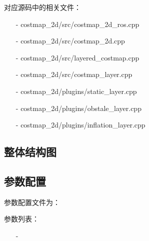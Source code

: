 \documentclass[9pt, oneside]{book}
\begin{document}
对应源码中的相关文件：

\begin{itemize}
    \item [-] costmap\_2d/src/costmap\_2d\_ros.cpp
    \item [-] costmap\_2d/src/costmap\_2d.cpp
    \item [-] costmap\_2d/src/layered\_costmap.cpp
    \item [-] costmap\_2d/src/costmap\_layer.cpp
    \item [-] costmap\_2d/plugins/static\_layer.cpp
    \item [-] costmap\_2d/plugins/obstale\_layer.cpp
    \item [-] costmap\_2d/plugins/inflation\_layer.cpp
\end{itemize}

\subsection{整体结构图}


\subsection{参数配置}

参数配置文件为：

参数列表：

\begin{itemize}
    \item [-] 
\end{itemize}
\end{document}
